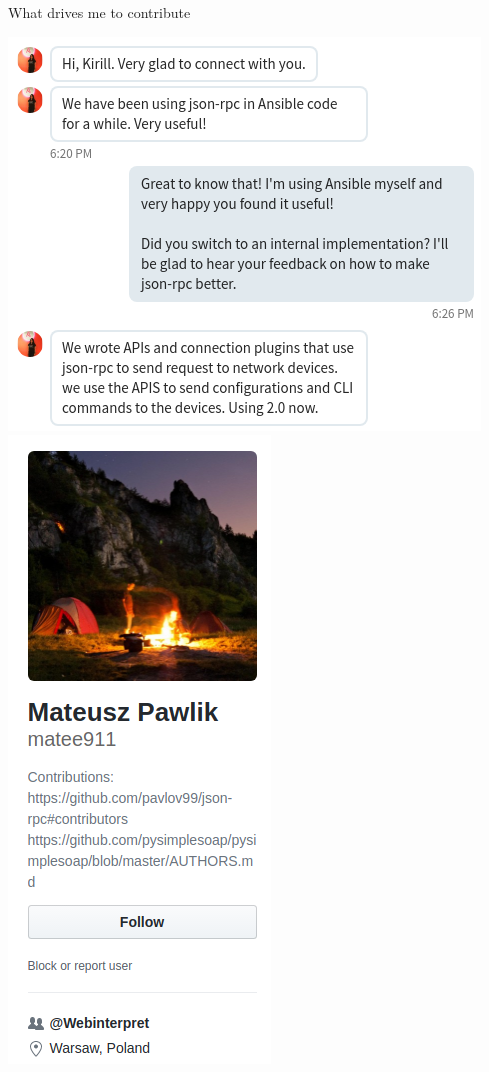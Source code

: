 \documentclass[unicode, notheorems, aspectratio=169]{beamer}
\begin{document}
\begin{frame}{What drives me to contribute}
\begin{center}
	\includegraphics[height=.8\textheight]{./images/ansible}\qquad
	\includegraphics[height=.8\textheight]{./images/drives-to-contribute}
\end{center}
\end{frame}
\end{document}
